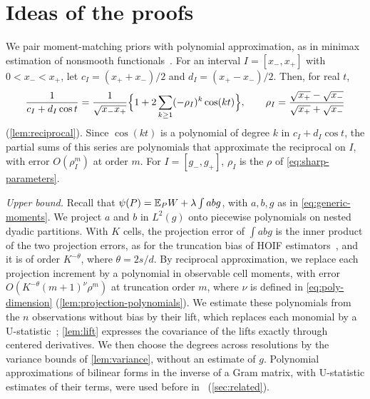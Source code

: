 \section{Ideas of the proofs}\label{sec:ideas}

We pair moment-matching priors with polynomial approximation,
as in minimax estimation of nonsmooth
functionals~\cite{lepski,cailow,jiaovenkathanweissman,wuyangentropy,wuyang}.
For an interval $I=[x_-,x_+]$ with
$0<x_-<x_+$, let $c_I=(x_++x_-)/2$ and $d_I=(x_+-x_-)/2$. Then, for
real $t$,
\begin{equation}\label{eq:intro-cosine}
 \frac1{c_I+d_I\cos t}=\frac1{\sqrt{x_-x_+}}
 \Bigl\{1+2\sum_{k\ge1}(-\rho_I)^k\cos(kt)\Bigr\},
 \qquad
 \rho_I=\frac{\sqrt{x_+}-\sqrt{x_-}}{\sqrt{x_+}+\sqrt{x_-}}
\end{equation}
(\cref{lem:reciprocal}). Since $\cos(kt)$ is a polynomial of
degree $k$ in $c_I+d_I\cos t$, the partial sums of this series are
polynomials that approximate the reciprocal on $I$, with error
$O(\rho_I^m)$ at order $m$. For $I=[g_-,g_+]$, $\rho_I$ is the $\rho$
of \eqref{eq:sharp-parameters}.

\emph{Upper bound.} Recall that $\psi(P)=\mathbb E_PW+\lambda\int abg$, with
$a,b,g$ as in \eqref{eq:generic-moments}. We project $a$ and $b$ in
$L^2(g)$ onto piecewise
polynomials on nested dyadic partitions. With $K$ cells, the projection
error of $\int abg$ is the inner product of the two projection errors,
as for the truncation bias of HOIF
estimators~\cite[Theorem~3.8]{hoif2008}, and it is of order
$K^{-\theta}$, where $\theta=2s/d$. By reciprocal approximation, we replace each projection increment by a
polynomial in observable cell moments, with error
$O(K^{-\theta}(m+1)^\nu\rho^m)$ at truncation order $m$, where $\nu$
is defined in \eqref{eq:poly-dimension}
(\cref{lem:projection-polynomials}). We estimate these polynomials
from the $n$ observations without bias by their lift, which replaces
each monomial by a U-statistic~\cite{halmos,hoeffding};
\cref{lem:lift} expresses the covariance of the lifts exactly
through centered derivatives. We then choose the degrees across
resolutions by the variance bounds of \cref{lem:variance}, without
an estimate of $g$. Polynomial approximations of bilinear forms in the
inverse of a Gram matrix, with U-statistic estimates of their terms,
were used before in~\cite{kongvaliant2018,chenliumukherjee2025}
(\cref{sec:related}).

